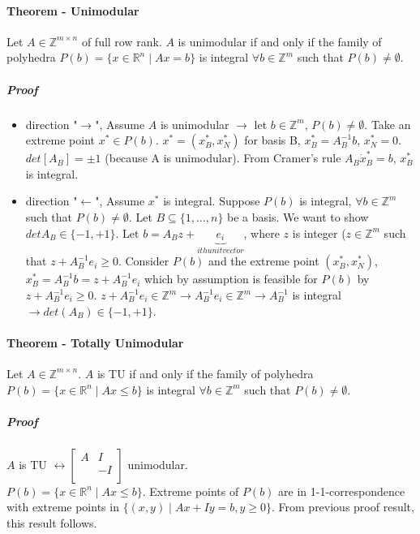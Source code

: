\documentclass[main]{subfiles}
\begin{document}
\paragraph{Theorem - Unimodular}
Let $A \in \mathbb{Z}^{m \times n}$ of full row rank. $A$ is unimodular if and
only if the family of polyhedra $P(b) = \{ x \in \mathbb{R}^{n} \mid Ax = b \}$
is integral $\forall b \in \mathbb{Z}^{m}$ such that $P(b) \neq \emptyset$.

\subparagraph{Proof}
\begin{itemize}
\item direction "$\rightarrow$", Assume $A$ is unimodular $\rightarrow$ let $b
\in \mathbb{Z}^{m}$, $P(b) \neq \emptyset$. Take an extreme point $x^{*} \in
P(b)$. $x^{*} = (x^{*}_{B}, x^{*}_{N})$ for basis B, $x^{*}_{B} = A^{-1}_{B}b$,
$x^{*}_{N} = 0$.\\
$det[A_{B}] = \pm 1$ (because A is unimodular). From Cramer's rule $A_{B} \dot
x^{*}_{B} = b$, $x^{*}_{B}$ is integral.

\item direction "$\leftarrow$", Assume $x^{*}$ is integral. Suppose $P(b)$ is
integral, $\forall b \in \mathbb{Z}^{m}$ such that $P(b) \neq \emptyset$. Let
$B \subseteq \{1, \dots, n\}$ be a basis. We want to show $det A_{B} \in \{-1,
+1\}$.
Let $b = A_{B}z + \underbrace{e_{i}}_{ith unit vector}$, where $z$ is integer
($z \in \mathbb{Z}^{m}$ such that $z + A^{-1}_{B} e_{i} \geq 0$. Consider
$P(b)$ and the extreme point $(x^{*}_{B}, x^{*}_{N})$, $x^{*}_{B} =
A^{-1}_{B}b = z + A^{-1}_{B} e_{i}$ which by assumption is feasible for $P(b)$
by $z + A^{-1}_{B} e_{i} \geq 0$. $z + A^{-1}_{B} e_{i} \in \mathbb{Z}^{m}
\rightarrow A^{-1}_{B} e_{i} \in \mathbb{Z}^{m} \rightarrow A^{-1}_{B}$ is
integral $\rightarrow det(A_{B}) \in \{-1, +1\}$.
\end{itemize}

\paragraph{Theorem - Totally Unimodular}
Let $A \in \mathbb{Z}^{m \times n}$. $A$ is TU if and only if the family of
polyhedra $P(b) = \{ x \in \mathbb{R}^{n} \mid Ax \leq b \}$ is integral
$\forall b \in \mathbb{Z}^{m}$ such that $P(b) \neq \emptyset$.

\subparagraph{Proof}
$A$ is TU $\leftrightarrow \begin{bmatrix}
A & I\\
 & -I\\
\end{bmatrix}$ unimodular.\\
$P(b) = \{x \in \mathbb{R}^{n} \mid Ax \leq b \}$. Extreme points of $P(b)$ are
in 1-1-correspondence with extreme points in $\{(x,y) \mid Ax + Iy = b, y \geq
0 \}$. From previous proof result, this result follows.
\end{document}

